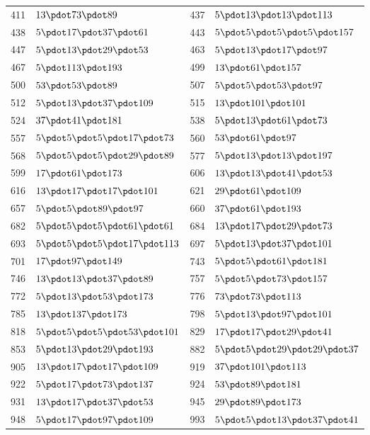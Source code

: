 \begin{longtable}{@{}r|l@{\qquad}r|l@{}}
411 & $13\pdot 73\pdot 89$ & 437 & $5\pdot 13\pdot 13\pdot 113$\\
438 & $5\pdot 17\pdot 37\pdot 61$ & 443 & $5\pdot 5\pdot 5\pdot 5\pdot 157$\\
447 & $5\pdot 13\pdot 29\pdot 53$ & 463 & $5\pdot 13\pdot 17\pdot 97$\\
467 & $5\pdot 113\pdot 193$ & 499 & $13\pdot 61\pdot 157$\\
500 & $53\pdot 53\pdot 89$ & 507 & $5\pdot 5\pdot 53\pdot 97$\\
512 & $5\pdot 13\pdot 37\pdot 109$ & 515 & $13\pdot 101\pdot 101$\\
524 & $37\pdot 41\pdot 181$ & 538 & $5\pdot 13\pdot 61\pdot 73$\\
557 & $5\pdot 5\pdot 5\pdot 17\pdot 73$ & 560 & $53\pdot 61\pdot 97$\\
568 & $5\pdot 5\pdot 5\pdot 29\pdot 89$ & 577 & $5\pdot 13\pdot 13\pdot 197$\\
599 & $17\pdot 61\pdot 173$ & 606 & $13\pdot 13\pdot 41\pdot 53$\\
616 & $13\pdot 17\pdot 17\pdot 101$ & 621 & $29\pdot 61\pdot 109$\\
657 & $5\pdot 5\pdot 89\pdot 97$ & 660 & $37\pdot 61\pdot 193$\\
682 & $5\pdot 5\pdot 5\pdot 61\pdot 61$ & 684 & $13\pdot 17\pdot 29\pdot 73$\\
693 & $5\pdot 5\pdot 5\pdot 17\pdot 113$ & 697 & $5\pdot 13\pdot 37\pdot 101$\\
701 & $17\pdot 97\pdot 149$ & 743 & $5\pdot 5\pdot 61\pdot 181$\\
746 & $13\pdot 13\pdot 37\pdot 89$ & 757 & $5\pdot 5\pdot 73\pdot 157$\\
772 & $5\pdot 13\pdot 53\pdot 173$ & 776 & $73\pdot 73\pdot 113$\\
785 & $13\pdot 137\pdot 173$ & 798 & $5\pdot 13\pdot 97\pdot 101$\\
818 & $5\pdot 5\pdot 5\pdot 53\pdot 101$ & 829 & $17\pdot 17\pdot 29\pdot 41$\\
853 & $5\pdot 13\pdot 29\pdot 193$ & 882 & $5\pdot 5\pdot 29\pdot 29\pdot 37$\\
905 & $13\pdot 17\pdot 17\pdot 109$ & 919 & $37\pdot 101\pdot 113$\\
922 & $5\pdot 17\pdot 73\pdot 137$ & 924 & $53\pdot 89\pdot 181$\\
931 & $13\pdot 17\pdot 37\pdot 53$ & 945 & $29\pdot 89\pdot 173$\\
948 & $5\pdot 17\pdot 97\pdot 109$ & 993 & $5\pdot 5\pdot 13\pdot 37\pdot 41$\\

\end{longtable}
